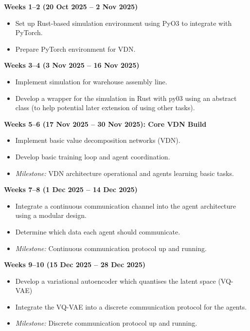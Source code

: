 \documentclass[20pt]{article}
\begin{document}
\begin{list}{}{\leftmargin=0cm \itemindent=0cm}

\item \textbf{Weeks 1--2 (20 Oct 2025 -- 2 Nov 2025)}
\begin{itemize}
\item Set up Rust-based simulation environment using PyO3 to integrate with PyTorch.
\item Prepare PyTorch environment for VDN.
\end{itemize}

\item \textbf{Weeks 3--4 (3 Nov 2025 -- 16 Nov 2025)}
\begin{itemize}
\item Implement simulation for warehouse assembly line.
\item Develop a wrapper for the simulation in Rust with py03 using an abstract class (to help potential later extension of using other tasks).
\end{itemize}

\item \textbf{Weeks 5--6 (17 Nov 2025 -- 30 Nov 2025): Core VDN Build}
\begin{itemize}
\item Implement basic value decomposition networks (VDN).
\item Develop basic training loop and agent coordination.
\item \textit{Milestone:} VDN architecture operational and agents learning basic tasks.
\end{itemize}

\item \textbf{Weeks 7--8 (1 Dec 2025 -- 14 Dec 2025)}
\begin{itemize}
\item Integrate a continuous communication channel into the agent architecture using a modular design.
\item Determine which data each agent should communicate.
\item \textit{Milestone:} Continuous communication protocol up and running.
\end{itemize}

\item \textbf{Weeks 9--10 (15 Dec 2025 -- 28 Dec 2025)}
\begin{itemize}
\item Develop a variational autoencoder which quantises the latent space (VQ-VAE)
\item Integrate the VQ-VAE into a discrete communication protocol for the agents.
\item \textit{Milestone:} Discrete communication protocol up and running.
\end{itemize}


\end{list}
\end{document}
